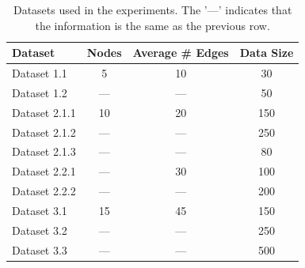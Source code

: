 \documentclass{lxaiproposal}
\begin{document}
    \begin{table}[h]
        \centering
        \begin{tabular}{|l|c|c|c|}
            \hline
            \textbf{Dataset} & \textbf{Nodes} & \textbf{Average # Edges} & \textbf{Data Size} \\
            \hline
            Dataset 1.1      & 5              & 10                        & 30                 \\
            Dataset 1.2      & ---            & ---                      & 50                 \\
            \hline
            Dataset 2.1.1    & 10             & 20                       & 150                \\
            Dataset 2.1.2    & ---            & ---                      & 250                \\
            Dataset 2.1.3    & ---            & ---                      & 80                 \\
            \hline
            Dataset 2.2.1    & ---            & 30                       & 100                \\
            Dataset 2.2.2    & ---            & ---                      & 200                \\
            \hline
            Dataset 3.1      & 15             & 45                       & 150                \\
            Dataset 3.2      & ---            & ---                      & 250                \\
            Dataset 3.3      & ---            & ---                      & 500                \\

            \hline
        \end{tabular}
        \caption{Datasets used in the experiments. The '---' indicates that the information is the same as the previous
        row.}
        \label{tab:datasets}
    \end{table}
\end{document}

